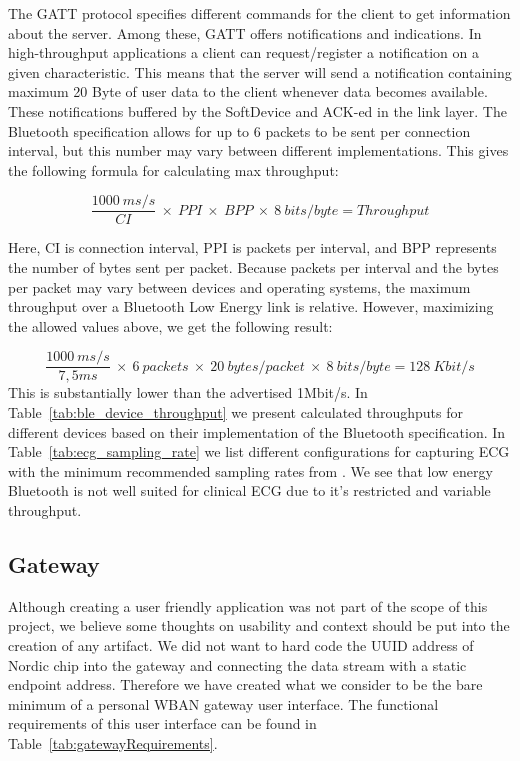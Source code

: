 The GATT protocol specifies different commands for the client to get information about the server. Among these, GATT offers notifications and indications. In high-throughput applications a client can request/register a notification on a given characteristic. This means that the server will send a notification containing maximum 20 Byte of user data to the client whenever data becomes available. These notifications buffered by the SoftDevice and ACK-ed in the link layer. The Bluetooth specification allows for up to 6 packets to be sent per connection interval, but this number may vary between different implementations. This gives the following formula for calculating max throughput:

\[
\frac{1000\: ms/s}{CI}\: \times\: PPI\: \times\: BPP\: \times\: 8\: bits/byte = Throughput
\]

\newline
\noindent
Here, CI is connection interval, PPI is packets per interval, and BPP represents the number of bytes sent per packet. Because packets per interval and the bytes per packet may vary between devices and operating systems, the maximum throughput over a Bluetooth Low Energy link is relative. However, maximizing the allowed values above, we get the following result: 

\[
\frac{1000\: ms/s}{7,5ms}\: \times\: 6\: packets\: \times\: 20\:bytes/packet\: \times\: 8\: bits/byte = 128\:Kbit/s
\]
\newline
\noindent
This is substantially lower than the advertised 1Mbit/s. In Table~\ref{tab:ble_device_throughput}  we present calculated throughputs for different devices based on their implementation of the Bluetooth specification. In Table~\ref{tab:ecg_sampling_rate} we list different configurations for capturing ECG with the minimum recommended sampling rates from \cite{Anonymous:j4z9MACD}. We see that low energy Bluetooth is not well suited for clinical ECG due to it's restricted and variable throughput.



\subsection{Gateway} %
\label{sub:gateway}


Although creating a user friendly application was not part of the scope of this project, we believe some thoughts on usability and context should be put into the creation of any artifact. We did not want to hard code the UUID address of Nordic chip into the gateway and connecting the data stream with a static endpoint address. Therefore we have created what we consider to be the bare minimum of a personal WBAN gateway user interface. The functional requirements of this user interface can be found in Table~\ref{tab:gatewayRequirements}.

